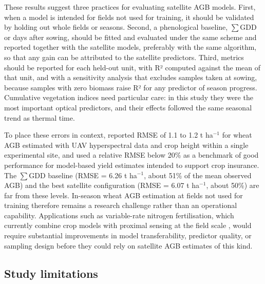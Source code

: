 \documentclass[
  british,
]{interact}
\begin{document}
These results suggest three practices for evaluating satellite AGB
models. First, when a model is intended for fields not used for
training, it should be validated by holding out whole fields or seasons.
Second, a phenological baseline, \(\sum\)GDD or days after sowing,
should be fitted and evaluated under the same scheme and reported
together with the satellite models, preferably with the same algorithm,
so that any gain can be attributed to the satellite predictors. Third,
metrics should be reported for each held-out unit, with R² computed
against the mean of that unit, and with a sensitivity analysis that
excludes samples taken at sowing, because samples with zero biomass
raise R² for any predictor of season progress. Cumulative vegetation
indices need particular care: in this study they were the most important
optical predictors, and their effects followed the same seasonal trend
as thermal time.

To place these errors in context, \citet{yue_estimation_2017} reported
RMSE of 1.1 to 1.2 t ha\(^{-1}\) for wheat AGB estimated with UAV
hyperspectral data and crop height within a single experimental site,
and \citet{arumugam_near_2020} used a relative RMSE below 20\% as a
benchmark of good performance for model-based yield estimates intended
to support crop insurance. The \(\sum\)GDD baseline (RMSE = 6.26 t
ha\(^{-1}\), about 51\% of the mean observed AGB) and the best satellite
configuration (RMSE = 6.07 t ha\(^{-1}\), about 50\%) are far from these
levels. In-season wheat AGB estimation at fields not used for training
therefore remains a research challenge rather than an operational
capability. Applications such as variable-rate nitrogen fertilisation,
which currently combine crop models with proximal sensing at the field
scale \citep{gobbo_evaluation_2022}, would require substantial
improvements in model transferability, predictor quality, or sampling
design before they could rely on satellite AGB estimates of this kind.

\subsection{Study limitations}\label{study-limitations}
\end{document}
